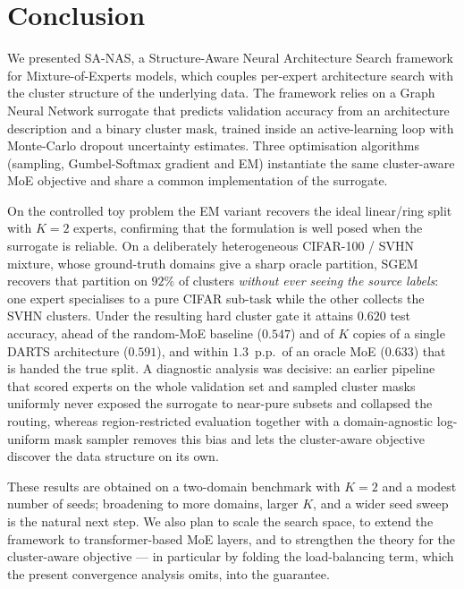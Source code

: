 \section{Conclusion}
\label{sec:conclusion}

We presented SA-NAS, a Structure-Aware Neural Architecture Search
framework for Mixture-of-Experts models, which couples per-expert
architecture search with the cluster structure of the underlying
data. The framework relies on a Graph Neural Network surrogate that
predicts validation accuracy from an architecture description and a
binary cluster mask, trained inside an active-learning loop with
Monte-Carlo dropout uncertainty estimates. Three optimisation
algorithms (sampling, Gumbel-Softmax gradient and EM) instantiate the
same cluster-aware MoE objective and share a common implementation
of the surrogate.

On the controlled toy problem the EM variant recovers the ideal
linear/ring split with $K = 2$ experts, confirming that the
formulation is well posed when the surrogate is reliable. On a
deliberately heterogeneous CIFAR-100 / SVHN mixture, whose
ground-truth domains give a sharp oracle partition, SGEM recovers that
partition on $92\%$ of clusters \emph{without ever seeing the source
labels}: one expert specialises to a pure CIFAR sub-task while the
other collects the SVHN clusters. Under the resulting hard cluster gate
it attains $0.620$ test accuracy, ahead of the random-MoE baseline
($0.547$) and of $K$ copies of a single DARTS architecture ($0.591$),
and within $1.3$~p.p.\ of an oracle MoE ($0.633$) that is handed the
true split. A diagnostic analysis was decisive: an earlier pipeline
that scored experts on the whole validation set and sampled cluster
masks uniformly never exposed the surrogate to near-pure subsets and
collapsed the routing, whereas region-restricted evaluation together
with a domain-agnostic log-uniform mask sampler removes this bias and
lets the cluster-aware objective discover the data structure on its
own.

These results are obtained on a two-domain benchmark with $K = 2$ and
a modest number of seeds; broadening to more domains, larger $K$, and a
wider seed sweep is the natural next step. We also plan to scale the
search space, to extend the framework to transformer-based MoE layers,
and to strengthen the theory for the cluster-aware objective --- in
particular by folding the load-balancing term, which the present
convergence analysis omits, into the guarantee.
